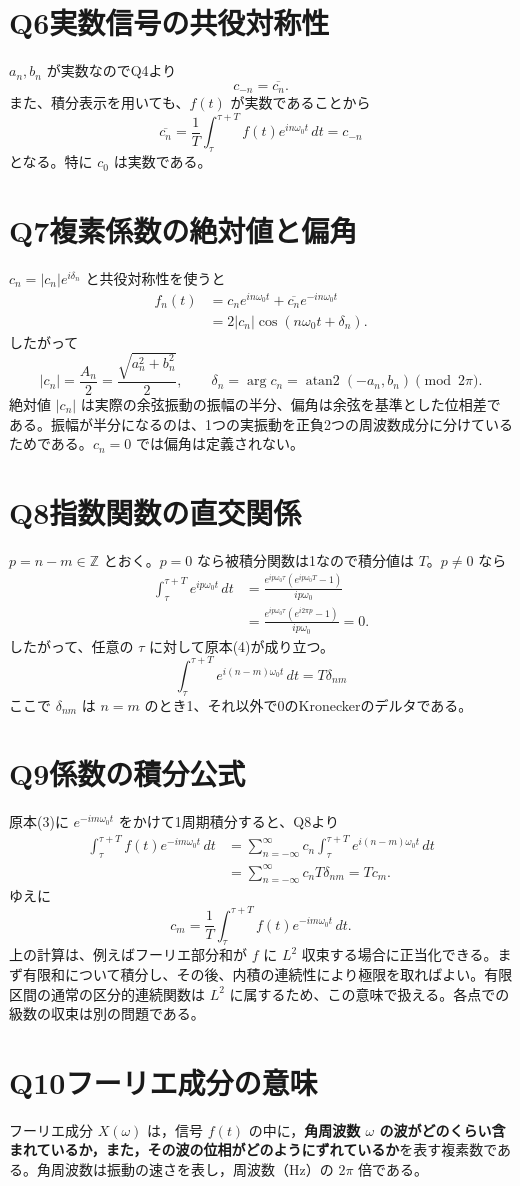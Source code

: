 \documentclass[a4paper,11pt]{article}
\newcommand{\Q}[2]{\section*{Q#1\quad #2}}
\newcommand{\conj}[1]{\overline{#1}}
\DeclareMathOperator{\atanTwo}{atan2}
\begin{document}
\Q{6}{実数信号の共役対称性}
$a_n,b_n$ が実数なのでQ4より
\[
\boxed{c_{-n}=\conj{c_n}}.
\]
また、積分表示を用いても、$f(t)$ が実数であることから
\[
\conj{c_n}
=\frac1T\int_\tau^{\tau+T}f(t)e^{in\omega_0t}\,dt=c_{-n}
\]
となる。特に $c_0$ は実数である。

\Q{7}{複素係数の絶対値と偏角}
$c_n=|c_n|e^{i\delta_n}$ と共役対称性を使うと
\begin{align*}
f_n(t)&=c_ne^{in\omega_0t}+\conj{c_n}e^{-in\omega_0t}\\
&=2|c_n|\cos(n\omega_0t+\delta_n).
\end{align*}
したがって
\[
\boxed{|c_n|=\frac{A_n}{2}=\frac{\sqrt{a_n^2+b_n^2}}{2}},\qquad
\boxed{\delta_n=\arg c_n=\atanTwo(-a_n,b_n)\pmod{2\pi}}.
\]
絶対値 $|c_n|$ は実際の余弦振動の振幅の半分、偏角は余弦を基準とした位相差である。振幅が半分になるのは、1つの実振動を正負2つの周波数成分に分けているためである。$c_n=0$ では偏角は定義されない。
\newpage
\Q{8}{指数関数の直交関係}
$p=n-m\in\mathbb Z$ とおく。$p=0$ なら被積分関数は1なので積分値は $T$。$p\ne0$ なら
\begin{align*}
\int_\tau^{\tau+T}e^{ip\omega_0t}\,dt
&=\frac{e^{ip\omega_0\tau}(e^{ip\omega_0T}-1)}{ip\omega_0}\\
&=\frac{e^{ip\omega_0\tau}(e^{i2\pi p}-1)}{ip\omega_0}=0.
\end{align*}
したがって、任意の $\tau$ に対して原本(4)が成り立つ。
\[
\boxed{\int_\tau^{\tau+T}e^{i(n-m)\omega_0t}\,dt=T\delta_{nm}}
\]
ここで $\delta_{nm}$ は $n=m$ のとき1、それ以外で0のKroneckerのデルタである。

\Q{9}{係数の積分公式}
原本(3)に $e^{-im\omega_0t}$ をかけて1周期積分すると、Q8より
\begin{align*}
\int_\tau^{\tau+T}f(t)e^{-im\omega_0t}\,dt
&=\sum_{n=-\infty}^{\infty}c_n
\int_\tau^{\tau+T}e^{i(n-m)\omega_0t}\,dt\\
&=\sum_{n=-\infty}^{\infty}c_nT\delta_{nm}=Tc_m.
\end{align*}
ゆえに
\[
\boxed{c_m=\frac1T\int_\tau^{\tau+T}f(t)e^{-im\omega_0t}\,dt}.
\]
上の計算は、例えばフーリエ部分和が $f$ に $L^2$ 収束する場合に正当化できる。まず有限和について積分し、その後、内積の連続性により極限を取ればよい。有限区間の通常の区分的連続関数は $L^2$ に属するため、この意味で扱える。各点での級数の収束は別の問題である。

\Q{10}{フーリエ成分の意味}
フーリエ成分 $X(\omega)$ は，信号 $f(t)$ の中に，\textbf{角周波数 $\omega$ の波がどのくらい含まれているか，また，その波の位相がどのようにずれているか}を表す複素数である。角周波数は振動の速さを表し，周波数（Hz）の $2\pi$ 倍である。
\end{document}
